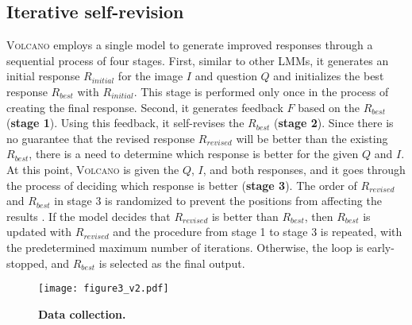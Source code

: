 \documentclass[11pt]{article}
\newcommand{\Ours}{\textsc{Volcano}}
\begin{document}
\subsection{Iterative self-revision}
\label{subsec:iterative}
{\Ours} employs a single model to generate improved responses through a sequential process of four stages. First, similar to other LMMs, it generates an initial response $R_{initial}$ for the image $I$ and question $Q$ and initializes the best response $R_{best}$ with $R_{initial}$. This stage is performed only once in the process of creating the final response. Second, it generates feedback $F$ based on the $R_{best}$ (\textbf{stage 1}). Using this feedback, it self-revises the $R_{best}$ (\textbf{stage 2}). Since there is no guarantee that the revised response $R_{revised}$ will be better than the existing $R_{best}$, there is a need to determine which response is better for the given $Q$ and $I$. At this point, {\Ours} is given the $Q$, $I$, and both responses, and it goes through the process of deciding which response is better (\textbf{stage 3}). The order of $R_{revised}$ and $R_{best}$ in stage 3 is randomized to prevent the positions from affecting the results \citep{wang2023large}. If the model decides that $R_{revised}$ is better than $R_{best}$, then $R_{best}$ is updated with $R_{revised}$ and the procedure from stage 1 to stage 3 is repeated, with the predetermined maximum number of iterations. Otherwise, the loop is early-stopped, and $R_{best}$ is selected as the final output. 
\begin{figure}[h!]
\texttt{[image: figure3\_v2.pdf]}
\caption{\textbf{Data collection.}}
\label{fig:figure3}
\end{figure}
\end{document}
